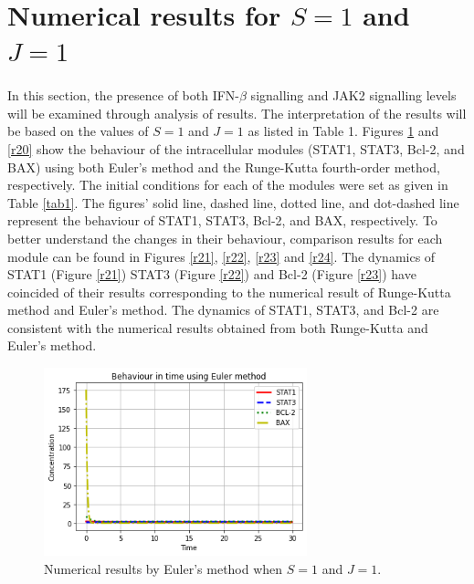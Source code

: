 \section{Numerical results for $S =1$ and $J=1$}
\paragraph{}


In this section, the presence of both IFN-$\beta$ signalling and JAK2 signalling levels will be examined through analysis of results. The interpretation of the results will be based on the values of $S=1$ and $J=1$ as listed in Table 1. Figures \ref{r19}  and \ref{r20}  show the behaviour of the intracellular modules (STAT1, STAT3, Bcl-2, and BAX) using both Euler's method and the Runge-Kutta fourth-order method, respectively. The initial conditions for each of the modules were set as given in Table \ref{tab1}. The figures' solid line, dashed line, dotted line, and dot-dashed line represent the behaviour of STAT1, STAT3, Bcl-2, and BAX, respectively. To better understand the changes in their behaviour, comparison results for each module can be found in Figures \ref{r21}, \ref{r22}, \ref{r23} and \ref{r24}. The dynamics of STAT1  (Figure \ref{r21}) STAT3  (Figure \ref{r22}) and Bcl-2 (Figure \ref{r23}) have coincided of their results corresponding to the numerical result of Runge-Kutta method and Euler's method. The dynamics of STAT1, STAT3, and Bcl-2 are consistent with the numerical results obtained from both Runge-Kutta and Euler's method.  

\newpage

 \begin{figure}[hbt!]
	\centering
	\begin{framed}
	\includegraphics[width=0.68\textwidth]{Figures/D/N1.png}
		\end{framed}
	\caption{Numerical results  by Euler's method when $S =1$ and $J=1$.}
	\label{r19}
\end{figure}

